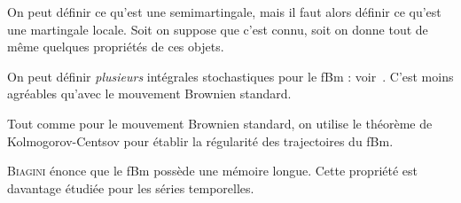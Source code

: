 \begin{prerequis}
  On peut définir ce qu'est une semimartingale, mais il faut alors
  définir ce qu'est une martingale locale. Soit on suppose que c'est
  connu, soit on donne tout de même quelques propriétés de ces objets.
\end{prerequis}

On peut définir \emph{plusieurs} intégrales stochastiques pour le fBm
: voir~\cite[Chp.~II-V]{biagini2008}. C'est moins agréables qu'avec le
mouvement Brownien standard.

Tout comme pour le mouvement Brownien standard, on utilise le théorème
de Kolmogorov-Centsov pour établir la régularité des trajectoires du
fBm.

\begin{alert}
  \textsc{Biagini} énonce que le fBm possède une mémoire longue. Cette
  propriété est davantage étudiée pour les séries temporelles.
\end{alert}